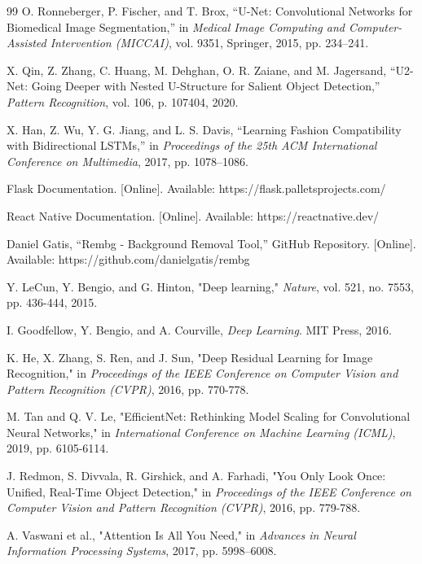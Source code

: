 \begin{thebibliography}{99}
O. Ronneberger, P. Fischer, and T. Brox, “U-Net: Convolutional Networks for Biomedical Image Segmentation,” in \textit{Medical Image Computing and Computer-Assisted Intervention (MICCAI)}, vol. 9351, Springer, 2015, pp. 234–241.

X. Qin, Z. Zhang, C. Huang, M. Dehghan, O. R. Zaiane, and M. Jagersand, “U2-Net: Going Deeper with Nested U-Structure for Salient Object Detection,” \textit{Pattern Recognition}, vol. 106, p. 107404, 2020.

X. Han, Z. Wu, Y. G. Jiang, and L. S. Davis, “Learning Fashion Compatibility with Bidirectional LSTMs,” in \textit{Proceedings of the 25th ACM International Conference on Multimedia}, 2017, pp. 1078–1086.

Flask Documentation. [Online]. Available: https://flask.palletsprojects.com/

React Native Documentation. [Online]. Available: https://reactnative.dev/

Daniel Gatis, “Rembg - Background Removal Tool,” GitHub Repository. [Online]. Available: https://github.com/danielgatis/rembg

Y. LeCun, Y. Bengio, and G. Hinton, "Deep learning," \textit{Nature}, vol. 521, no. 7553, pp. 436-444, 2015.

I. Goodfellow, Y. Bengio, and A. Courville, \textit{Deep Learning}. MIT Press, 2016.

K. He, X. Zhang, S. Ren, and J. Sun, "Deep Residual Learning for Image Recognition," in \textit{Proceedings of the IEEE Conference on Computer Vision and Pattern Recognition (CVPR)}, 2016, pp. 770-778.

M. Tan and Q. V. Le, "EfficientNet: Rethinking Model Scaling for Convolutional Neural Networks," in \textit{International Conference on Machine Learning (ICML)}, 2019, pp. 6105-6114.

J. Redmon, S. Divvala, R. Girshick, and A. Farhadi, "You Only Look Once: Unified, Real-Time Object Detection," in \textit{Proceedings of the IEEE Conference on Computer Vision and Pattern Recognition (CVPR)}, 2016, pp. 779-788.

A. Vaswani et al., "Attention Is All You Need," in \textit{Advances in Neural Information Processing Systems}, 2017, pp. 5998–6008.


\end{thebibliography}
